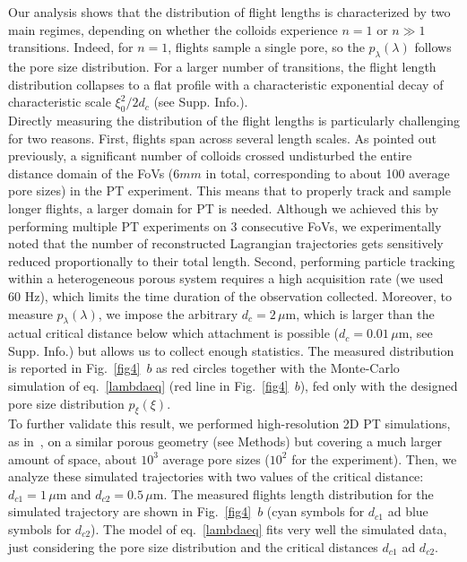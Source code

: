 \documentclass[singlecolumn,pre,notitlepage,preprintnumbers,floatfix,superscriptaddress]{revtex4-1}
\begin{document}
\noindent
Our analysis shows that the distribution of flight lengths is characterized by two main regimes, depending on whether the colloids experience $n = 1$ or $n \gg 1$ transitions. Indeed, for $n=1$, flights sample a single pore, so the  $p_\lambda(\lambda)$ follows the pore size distribution. For a larger number of transitions, the flight length distribution collapses to a flat profile with a characteristic exponential decay of characteristic scale $\xi_0^2 / 2d_c$ (see Supp. Info.). \\

\noindent
Directly measuring the distribution of the flight lengths is particularly challenging for two reasons. First, flights span across several length scales. As pointed out previously, a significant number of colloids crossed undisturbed the entire distance domain of the FoVs ($6mm$ in total, corresponding to about 100 average pore sizes) in the PT experiment. This means that to properly track and sample longer flights, a larger domain for PT is needed. Although we achieved this by performing multiple PT experiments on 3 consecutive FoVs, we experimentally noted that the number of reconstructed Lagrangian trajectories gets sensitively reduced proportionally to their total length. Second, performing particle tracking within a heterogeneous porous system requires a high acquisition rate (we used $60$ Hz), which limits the time duration of the observation collected. Moreover, to measure $p_\lambda(\lambda)$, we impose the arbitrary $d_c = 2\,\mu$m, which is larger than the actual critical distance below which attachment is possible ($d_c = 0.01\, \mu$m, see Supp. Info.) but allows us to collect enough statistics. The measured distribution is reported in Fig.~\ref{fig4}~$b$ as red circles together with the Monte-Carlo simulation of eq.~\eqref{lambdaeq} (red line in Fig.~\ref{fig4}~$b$), fed only with the designed pore size distribution $p_\xi(\xi)$.  \\

\noindent
To further validate this result, we performed high-resolution 2D PT simulations, as in~\cite{deAnnaPRF2017}, on a similar porous geometry (see Methods) but covering a much larger amount of space, about $10^3$ average pore sizes ($10^2$ for the experiment). Then, we analyze these simulated trajectories with two values of the critical distance: $d_{c1} = 1 \, \mu$m and $d_{c2} = 0.5 \, \mu$m. The measured flights length distribution for the simulated trajectory are shown in Fig.~\ref{fig4}~$b$ (cyan symbols for $d_{c1}$ ad blue symbols for $d_{c2}$). The model of eq.~\eqref{lambdaeq} fits very well the simulated data, just considering the pore size distribution and the critical distances $d_{c1}$ ad $d_{c2}$. \\
\end{document}

